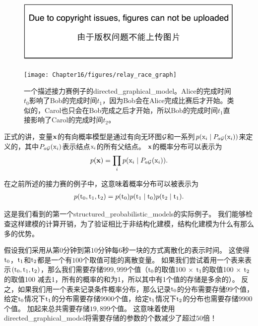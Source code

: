 \begin{figure}[!htb]
\ifOpenSource
\centerline{\includegraphics{figure.pdf}}
\else
	\centerline{\texttt{[image: Chapter16/figures/relay\_race\_graph]}}	
\fi
	\caption{一个描述接力赛例子的\gls{directed_graphical_model}。Alice的完成时间$t_0$影响了Bob的完成时间$t_1$，因为Bob会在Alice完成比赛后才开始。类似的，Carol也只会在Bob完成之后才开始，所以Bob的完成时间$t_1$直接影响了Carol的完成时间$t_2$。}
	\label{fig:relay_race_graph}
\end{figure}


正式的讲，变量$\mathbf{x}$的有向概率模型是通过有向无环图$\mathcal{G}$和一系列$p(\mathrm{x}_i\mid P_{a\mathcal{G}}(\mathrm{x}_i))$来定义的，其中$P_{a\mathcal{G}}(\mathrm{x}_i)$表示结点$\mathrm{x}_i$的所有父结点。
$\mathbf{x}$的概率分布可以表示为
\begin{align}
\label{eqn:161}
p(\mathbf{x}) = \prod_{i} p(\mathrm{x}_i\mid P_{a\mathcal{G}}(\mathrm{x}_i)).
\end{align}


在之前所述的接力赛的例子中，这意味着概率分布可以被表示为
\begin{align}
\label{eqn:162}
p(\mathrm{t}_0,\mathrm{t}_1,\mathrm{t}_2) = p(\mathrm{t}_0)p(\mathrm{t}_1\mid \mathrm{t}_0)p(\mathrm{t}_2\mid \mathrm{t}_1).
\end{align}


这是我们看到的第一个\gls{structured_probabilistic_models}的实际例子。
我们能够检查这样建模的计算开销，为了验证相比于非结构化建模，结构化建模为什么有那么多的优势。


假设我们采用从第$0$分钟到第$10$分钟每$6$秒一块的方式离散化的表示时间。
这使得$\mathrm{t}_0$，$\mathrm{t}_1$和$\mathrm{t}_2$都是一个有$100$个取值可能的离散变量。
如果我们尝试着用一个表来表示$(\mathrm{t}_0,\mathrm{t}_1,\mathrm{t}_2)$，那么我们需要存储$999,999$个值（$\mathrm{t}_0$的取值100 $\times$ $\mathrm{t}_1$的取值100 $\times$ $\mathrm{t}_2$的取值100 减去1，所有的概率的和为1，所以其中有1个值的存储是多余的）。
反之，如果我们用一个表来记录条件概率分布，那么记录$\mathrm{t}_0$的分布需要存储$99$个值，给定$\mathrm{t}_0$情况下$\mathrm{t}_1$的分布需要存储9900个值，给定$\mathrm{t}_1$情况下$\mathrm{t}_2$的分布也需要存储$9900$个值。
加起来总共需要存储$19, 899$个值。
这意味着使用\gls{directed_graphical_model}将需要存储的参数的个数减少了超过$50$倍！


